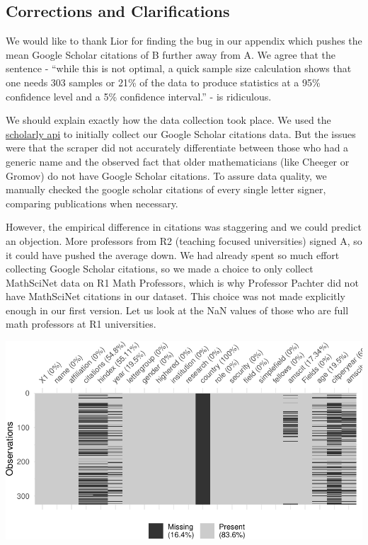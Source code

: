 \documentclass[]{article}
\begin{document}
\hypertarget{corrections-and-clarifications}{%
\subsection{Corrections and
Clarifications}\label{corrections-and-clarifications}}

We would like to thank Lior for finding the bug in our appendix which
pushes the mean Google Scholar citations of B further away from A. We
agree that the sentence - ``while this is not optimal, a quick sample
size calculation shows that one needs 303 samples or 21\% of the data to
produce statistics at a 95\% confidence level and a 5\% confidence
interval.'' - is ridiculous.

We should explain exactly how the data collection took place. We used
the \href{https://pypi.org/project/scholarly/}{scholarly api} to
initially collect our Google Scholar citations data. But the issues were
that the scraper did not accurately differentiate between those who had
a generic name and the observed fact that older mathematicians (like
Cheeger or Gromov) do not have Google Scholar citations. To assure data
quality, we manually checked the google scholar citations of every
single letter signer, comparing publications when necessary.

However, the empirical difference in citations was staggering and we
could predict an objection. More professors from R2 (teaching focused
universities) signed A, so it could have pushed the average down. We had
already spent so much effort collecting Google Scholar citations, so we
made a choice to only collect MathSciNet data on R1 Math Professors,
which is why Professor Pachter did not have MathSciNet citations in our
dataset. This choice was not made explicitly enough in our first
version. Let us look at the NaN values of those who are full math
professors at R1 universities.

\includegraphics{index_files/figure-latex/unnamed-chunk-3-1.pdf}
\end{document}
